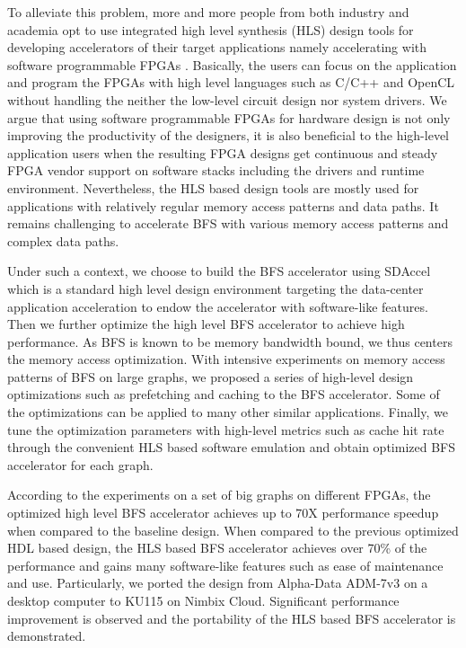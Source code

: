 To alleviate this problem, more and more people from both industry and 
academia opt to use integrated high level synthesis (HLS) design tools for 
developing accelerators of their target applications namely 
accelerating with software programmable FPGAs \cite{koch2016fpgas, xilinx-sdaccel}.
Basically, the users can focus on the application and program the FPGAs with high 
level languages such as C/C++ and OpenCL without handling the neither the low-level 
circuit design nor system drivers. We argue that using software programmable FPGAs for hardware 
design is not only improving 
the productivity of the designers, it is also 
beneficial to the high-level application users when the resulting 
FPGA designs get continuous and steady FPGA vendor support on software stacks 
including the drivers and runtime environment. Nevertheless, the HLS based design tools are 
mostly used for applications with relatively regular memory access 
patterns and data paths. It remains challenging to accelerate BFS with various memory 
access patterns and complex data paths.

Under such a context, we choose to build the BFS accelerator using SDAccel 
which is a standard high level design environment targeting 
the data-center application acceleration to endow the accelerator with software-like features.
Then we further optimize the high level BFS accelerator to achieve high performance.
As BFS is known to be memory bandwidth bound, we thus centers the memory 
access optimization. With intensive experiments on memory access patterns of BFS on large graphs, 
we proposed a series of high-level design optimizations such as prefetching and caching 
to the BFS accelerator. Some of the optimizations can be applied to many other similar applications. 
Finally, we tune the optimization parameters with high-level metrics 
such as cache hit rate through the convenient HLS based 
software emulation and obtain optimized BFS accelerator for each graph. 

According to the experiments on a set of big graphs on different FPGAs, the optimized high level BFS 
accelerator achieves up to 70X performance speedup when compared to the baseline 
design. When compared to the previous optimized HDL based design, 
the HLS based BFS accelerator achieves over 70\% of the performance 
and gains many software-like features 
such as ease of maintenance and use. Particularly, we 
ported the design from Alpha-Data ADM-7v3 on a desktop computer to 
KU115 on Nimbix Cloud. Significant performance improvement is observed and 
the portability of the HLS based BFS accelerator is demonstrated.

